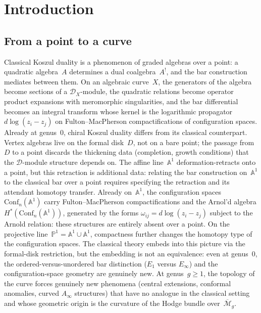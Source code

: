 \documentclass[11pt]{report}
\theoremstyle{definition}
\theoremstyle{remark}
\numberwithin{equation}{section}
\begin{document}
\chapter{Introduction}

\section{From a point to a curve}
\label{sec:volume-one-route}

Classical Koszul duality is a phenomenon of graded algebras over a point: a quadratic algebra~$A$ determines a dual coalgebra~$A^!$, and the bar construction mediates between them. On an algebraic curve~$X$, the generators of the algebra become sections of a $\mathcal{D}_X$-module, the quadratic relations become operator product expansions with meromorphic singularities, and the bar differential becomes an integral transform whose kernel is the logarithmic propagator $d\log(z_i - z_j)$ on Fulton--MacPherson compactifications of configuration spaces. Already at genus~$0$, chiral Koszul duality differs from its classical counterpart. Vertex algebras live on the formal disk~$D$, not on a bare point; the passage from~$D$ to a point discards the thickening data (completion, growth conditions) that the $\mathcal{D}$-module structure depends on. The affine line~$\mathbb{A}^1$ deformation-retracts onto a point, but this retraction is additional data: relating the bar construction on~$\mathbb{A}^1$ to the classical bar over a point requires specifying the retraction and its attendant homotopy transfer. Already on~$\mathbb{A}^1$, the configuration spaces $\mathrm{Conf}_n(\mathbb{A}^1)$ carry Fulton--MacPherson compactifications and the Arnol'd algebra $H^*(\mathrm{Conf}_n(\mathbb{A}^1))$, generated by the forms $\omega_{ij} = d\log(z_i - z_j)$ subject to the Arnold relation: these structures are entirely absent over a point. On the projective line~$\mathbb{P}^1 = \mathbb{A}^1 \cup \mathbb{A}^1$, compactness further changes the homotopy type of the configuration spaces. The classical theory embeds into this picture via the formal-disk restriction, but the embedding is not an equivalence: even at genus~$0$, the ordered-versus-unordered bar distinction ($E_1$ versus $E_\infty$) and the configuration-space geometry are genuinely new. At genus~$g \geq 1$, the topology of the curve forces genuinely new phenomena (central extensions, conformal anomalies, curved $A_\infty$ structures) that have no analogue in the classical setting and whose geometric origin is the curvature of the Hodge bundle over~$\overline{\mathcal{M}}_g$.
\end{document}
